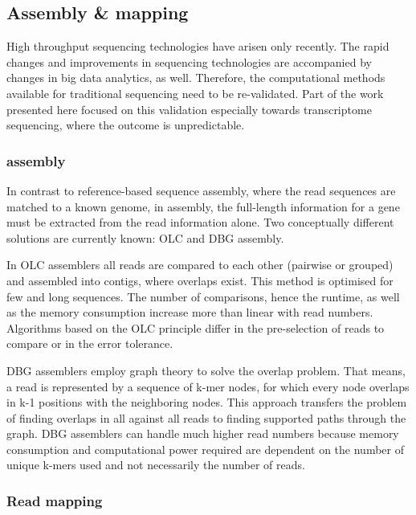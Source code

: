 \subsection{Assembly \& mapping}
High throughput sequencing technologies have arisen only recently.
The rapid changes and improvements in sequencing technologies are accompanied by changes in big data analytics, as well.
Therefore, the computational methods available for traditional sequencing need to be re-validated.
Part of the work presented here focused on this validation especially towards  transcriptome sequencing, where the outcome is unpredictable.
\subsubsection{ assembly}
In contrast to reference-based sequence assembly, where the read sequences are matched to a known genome, in  assembly, the full-length information for a gene must be extracted from the read information alone.
Two conceptually different solutions are currently known: \ac{OLC} and \ac{DBG} assembly.

In \ac{OLC} assemblers all reads are compared to each other (pairwise or grouped) and assembled into contigs, where overlaps exist.
This method is optimised for few and long sequences.
The number of comparisons, hence the runtime, as well as the memory consumption increase more than linear with read numbers.
Algorithms based on the \ac{OLC} principle differ in the pre-selection of reads to compare or in the error tolerance.

\ac{DBG} assemblers employ graph theory to solve the overlap problem.
That means, a read is represented by a sequence of k-mer nodes, for which every node overlaps in k-1 positions with the neighboring nodes.
This approach transfers the problem of finding overlaps in all against all reads to finding supported paths through the graph.
\ac{DBG} assemblers can handle much higher read numbers because memory consumption and computational power required are dependent on the number of unique k-mers used and not necessarily the number of reads.

\subsubsection{Read mapping}

